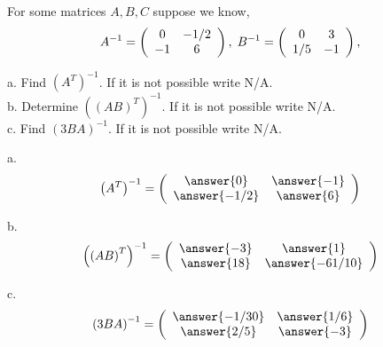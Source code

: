 \documentclass{ximera}
\author{Parisa Fatheddin}
\begin{document}
\begin{exercise}
For some matrices $A, B, C$ suppose we know,
\[ A^{-1} = \left(\begin{array}{ccc}
 0 & -1/2 \\
-1 & 6
\end{array}\right), \hspace{.1cm} B^{-1} =
\left(\begin{array}{ccc}
0 & 3  \\
1/5 & -1
\end{array}\right), \]

a. Find $\left(A^{T}\right)^{-1}$. If it is not possible write N/A. \\
b. Determine $\left((AB)^{T}\right)^{-1}$. If it is not possible write N/A.\\
c. Find $\left(3BA\right)^{-1}$. If it is not possible write N/A.
\begin{prompt}
a. \[ \left(A^{T}\right)^{-1} = \left(\begin{array}{cc}
\answer{0} & \answer{-1}\\
\answer{-1/2} & \answer{6}
\end{array}\right)\]

b. \[ \left(\left(AB\right)^{T}\right)^{-1} = \left(\begin{array}{cc}
\answer{-3} & \answer{1}\\
\answer{18} & \answer{-61/10}
\end{array}\right)
\]

c. \[ \left(3BA\right)^{-1}= \left(\begin{array}{cc}
\answer{-1/30} & \answer{1/6}\\
\answer{2/5} & \answer{-3}
\end{array}\right)
\]





\end{prompt}
\end{exercise}
\end{document}

